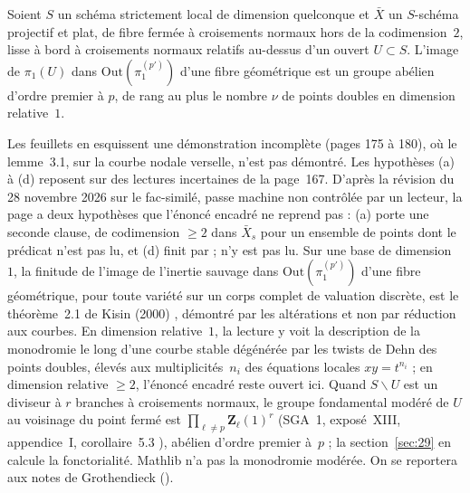 \begin{encadre}
\begin{theoreme*}\nonverifie
Soient $S$ un schéma strictement local de dimension quelconque et $\bar X$ un $S$-schéma projectif et plat, de fibre fermée à croisements normaux hors de la codimension~$2$, lisse à bord à croisements normaux relatifs au-dessus d'un ouvert $U \subset S$. L'image de $\pi_1(U)$ dans $\mathrm{Out}(\pi_1^{(p')})$ d'une fibre géométrique est un groupe abélien d'ordre premier à $p$, de rang au plus le nombre $\nu$ de points doubles en dimension relative~$1$.
\end{theoreme*}
\end{encadre}
{\small Les feuillets en esquissent une démonstration incomplète (pages 175 à 180), où le lemme~3.1, sur la courbe nodale verselle, n'est pas démontré. Les hypothèses (a) à (d) reposent sur des lectures incertaines de la page~167. D'après la révision du 28 novembre 2026 sur le fac-similé, passe machine non contrôlée par un lecteur, la page a deux hypothèses que l'énoncé encadré ne reprend pas : (a) porte une seconde clause, de codimension $\geq 2$ dans $\bar X_s$ pour un ensemble de points dont le prédicat n'est pas lu, et (d) finit par  ;  n'y est pas lu. Sur une base de dimension~$1$, la finitude de l'image de l'inertie sauvage dans $\mathrm{Out}(\pi_1^{(p')})$ d'une fibre géométrique, pour toute variété sur un corps complet de valuation discrète, est le théorème~2.1 de Kisin (2000) \cite{kisin2000}, démontré par les altérations et non par réduction aux courbes. En dimension relative~$1$, la lecture y voit la description de la monodromie le long d'une courbe stable dégénérée par les twists de Dehn des points doubles, élevés aux multiplicités~$n_i$ des équations locales $xy = t^{n_i}$ ; en dimension relative $\geq 2$, l'énoncé encadré reste ouvert ici. Quand $S \smallsetminus U$ est un diviseur à $r$ branches à croisements normaux, le groupe fondamental modéré de $U$ au voisinage du point fermé est $\prod_{\ell \neq p} \mathbf Z_\ell(1)^r$ (SGA~1, exposé~XIII, appendice~I, corollaire~5.3 \cite{sga1}), abélien d'ordre premier à~$p$ ; la section~\ref{sec:29} en calcule la fonctorialité. Mathlib n'a pas la monodromie modérée. On se reportera aux notes de Grothendieck ().\par}

